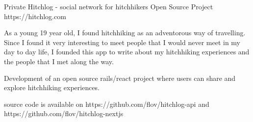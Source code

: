 

\begin{cventries}

  \cventry
    {Private}
    {Hitchlog - social network for hitchhikers} %
    {Open Source Project} %
    {https://hitchlog.com} %
    {
      \begin{cvitems} %
        \item As a young 19 year old, I found hitchhiking as an adventorous way of travelling. Since I found it very interesting to meet people that I would never meet in my day to day life, I founded this app to write about my hitchhiking experiences and the people that I met along the way.
        \item Development of an open source rails/react project where users can share and explore hitchhiking experiences.
        \item source code is available on https://github.com/flov/hitchlog-api and https://github.com/flov/hitchlog-nextjs
      \end{cvitems}
    }

\end{cventries}
